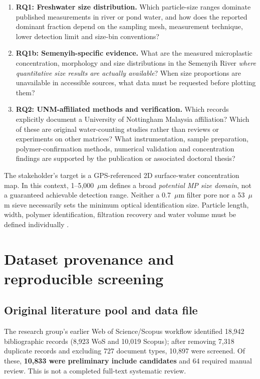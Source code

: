 \documentclass[10pt,a4paper]{article}
\begin{document}
\begin{enumerate}
\item \textbf{RQ1: Freshwater size distribution.} Which particle-size ranges dominate published measurements in river or pond water, and how does the reported dominant fraction depend on the sampling mesh, measurement technique, lower detection limit and size-bin conventions?
\item \textbf{RQ1b: Semenyih-specific evidence.} What are the measured microplastic concentration, morphology and size distributions in the Semenyih River \emph{where quantitative size results are actually available}? When size proportions are unavailable in accessible sources, what data must be requested before plotting them?
\item \textbf{RQ2: UNM-affiliated methods and verification.} Which records explicitly document a University of Nottingham Malaysia affiliation? Which of these are original water-counting studies rather than reviews or experiments on other matrices? What instrumentation, sample preparation, polymer-confirmation methods, numerical validation and concentration findings are supported by the publication or associated doctoral thesis?
\end{enumerate}

The stakeholder's target is a GPS-referenced 2D surface-water concentration map. In this context, 1--5,000~$\mu$m defines a broad \emph{potential MP size domain}, not a guaranteed achievable detection range. Neither a 0.7~$\mu$m filter pore nor a 53~$\mu$m sieve necessarily sets the minimum optical identification size. Particle length, width, polymer identification, filtration recovery and water volume must be defined individually \cite{ChenThesis2023,Lofty2023}.

\section{Dataset provenance and reproducible screening}
\subsection{Original literature pool and data file}
The research group's earlier Web of Science/Scopus workflow identified 18,942 bibliographic records (8,923 WoS and 10,019 Scopus); after removing 7,318 duplicate records and excluding 727 document types, 10,897 were screened. Of these, \textbf{10,833 were preliminary include candidates} and 64 required manual review. This is not a completed full-text systematic review.
\end{document}
